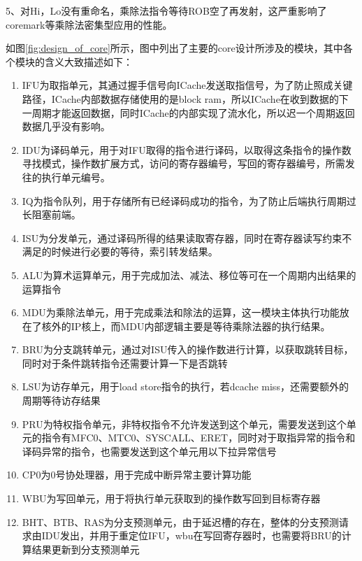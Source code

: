 \documentclass[lang=cn,11pt,a4paper]{elegantpaper}
\begin{document}
5、对Hi，Lo没有重命名，乘除法指令等待ROB空了再发射，这严重影响了coremark等乘除法密集型应用的性能。



如图\ref{fig:design_of_core}所示，图中列出了主要的core设计所涉及的模块，其中各个模块的含义大致描述如下：

\begin{enumerate}
\item IFU为取指单元，其通过握手信号向ICache发送取指信号，为了防止照成关键路径，ICache内部数据存储使用的是block ram，所以ICache在收到数据的下一周期才能返回数据，同时ICache的内部实现了流水化，所以迟一个周期返回数据几乎没有影响。

\item IDU为译码单元，用于对IFU取得的指令进行译码，以取得这条指令的操作数寻找模式，操作数扩展方式，访问的寄存器编号，写回的寄存器编号，所需发往的执行单元编号。

\item IQ为指令队列，用于存储所有已经译码成功的指令，为了防止后端执行周期过长阻塞前端。

\item ISU为分发单元，通过译码所得的结果读取寄存器，同时在寄存器读写约束不满足的时候进行必要的等待，索引转发结果。

\item ALU为算术运算单元，用于完成加法、减法、移位等可在一个周期内出结果的运算指令

\item MDU为乘除法单元，用于完成乘法和除法的运算，这一模块主体执行功能放在了核外的IP核上，而MDU内部逻辑主要是等待乘除法器的执行结果。

\item BRU为分支跳转单元，通过对ISU传入的操作数进行计算，以获取跳转目标，同时对于条件跳转指令还需要计算一下是否跳转

\item LSU为访存单元，用于load store指令的执行，若dcache miss，还需要额外的周期等待访存结果

\item PRU为特权指令单元，非特权指令不允许发送到这个单元，需要发送到这个单元的指令有MFC0、MTC0、SYSCALL、ERET，同时对于取指异常的指令和译码异常的指令，也需要发送到这个单元用以下拉异常信号

\item CP0为0号协处理器，用于完成中断异常主要计算功能

\item WBU为写回单元，用于将执行单元获取到的操作数写回到目标寄存器

\item BHT、BTB、RAS为分支预测单元，由于延迟槽的存在，整体的分支预测请求由IDU发出，并用于重定位IFU，wbu在写回寄存器时，也需要将BRU的计算结果更新到分支预测单元
\end{enumerate}

\newpage

%
%
\end{document}
